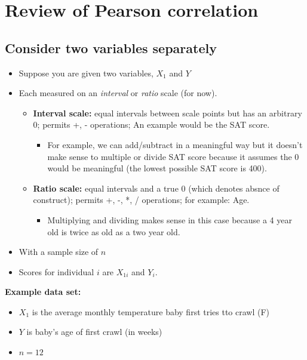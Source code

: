 \documentclass[
]{book}
\providecommand{\tightlist}{%
  \setlength{\itemsep}{0pt}\setlength{\parskip}{0pt}}
\begin{document}
\hypertarget{corr}{%
\chapter{Review of Pearson correlation}\label{corr}}

\hypertarget{consider-two-variables-separately}{%
\section{Consider two variables separately}\label{consider-two-variables-separately}}

\begin{itemize}
\tightlist
\item
  Suppose you are given two variables, \(X_1\) and \(Y\)
\item
  Each measured on an \emph{interval} or \emph{ratio} scale (for now).

  \begin{itemize}
  \tightlist
  \item
    \textbf{Interval scale:} equal intervals between scale points but has an arbitrary 0; permits +, - operations; An example would be the SAT score.

    \begin{itemize}
    \tightlist
    \item
      For example, we can add/subtract in a meaningful way but it doesn't make sense to multiple or divide SAT score because it assumes the 0 would be meaningful (the lowest possible SAT score is 400).
    \end{itemize}
  \item
    \textbf{Ratio scale:} equal intervals and a true 0 (which denotes absnce of construct); permits +, -, *, / operations; for example: Age.

    \begin{itemize}
    \tightlist
    \item
      Multiplying and dividing makes sense in this case because a 4 year old is twice as old as a two year old.
    \end{itemize}
  \end{itemize}
\item
  With a sample size of \(n\)
\item
  Scores for individual \(i\) are \(X_{1i}\) and \(Y_i\).
\end{itemize}

\textbf{Example data set:}

\begin{itemize}
\tightlist
\item
  \(X_1\) is the average monthly temperature baby first tries tto crawl (F)
\item
  \(Y\) is baby's age of first crawl (in weeks)
\item
  \(n = 12\)
\end{itemize}
\end{document}
